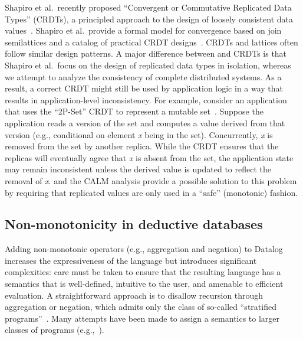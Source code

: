 Shapiro et al.\ recently proposed ``Convergent or Commutative Replicated Data
Types'' (CRDTs), a principled approach to the design of loosely consistent data
values~\cite{Shapiro2011b}. Shapiro et al.\ provide a formal model for
convergence based on join semilattices and a catalog of practical CRDT
designs~\cite{Shapiro2011a}. CRDTs and \lang lattices often follow similar
design patterns. A major difference between \lang and CRDTs is that Shapiro et
al.\ focus on the design of replicated data types in isolation, whereas we
attempt to analyze the consistency of complete distributed systems. As a result,
a correct CRDT might still be used by application logic in a way that results in
application-level inconsistency. For example, consider an application that uses
the ``2P-Set'' CRDT to represent a mutable set~\cite{Shapiro2011a}. Suppose the
application reads a version of the set and computes a value derived from that
version (e.g., conditional on element \emph{x} being in the set). Concurrently,
\emph{x} is removed from the set by another replica. While the CRDT ensures that
the replicas will eventually agree that \emph{x} is absent from the set, the
application state may remain inconsistent unless the derived value is updated to
reflect the removal of \emph{x}. \lang and the CALM analysis provide a possible
solution to this problem by requiring that replicated values are only used in a
``safe'' (monotonic) fashion.





\subsection{Non-monotonicity in deductive databases}
Adding non-monotonic operators (e.g., aggregation and negation) to Datalog
increases the expressiveness of the language but introduces significant
complexities: care must be taken to ensure that the resulting language has a
semantics that is well-defined, intuitive to the user, and amenable to efficient
evaluation. A straightforward approach is to disallow recursion through
aggregation or negation, which admits only the class of so-called ``stratified
programs''~\cite{Apt1988}. Many attempts have been made to assign a semantics to
larger classes of programs (e.g.,~\cite{Gelfond1988,Ross1990,VanGelder1991}).

